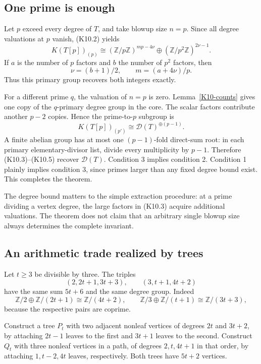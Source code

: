 \documentclass[11pt,a4paper]{article}
\theoremstyle{definition}\newtheorem{definition}[theorem]{Definition}
\theoremstyle{remark}\newtheorem{remark}[theorem]{Remark}
\newcommand{\Z}{\mathbb Z}\newcommand{\Q}{\mathbb Q}\newcommand{\F}{\mathbb F}
\numberwithin{equation}{section}
\begin{document}
\subsection{One prime is enough}\label{K10-sec-3}
Let $p$ exceed every degree of $T$, and take blowup size $n=p$. Since all degree valuations at $p$ vanish, (K10.2) yields
\[
 K(T[p])_{(p)}\cong
 (\Z/p\Z)^{mp-4\nu}\oplus(\Z/p^2\Z)^{2\nu-1}.             \tag{K10.3}
\]
If $a$ is the number of $p$ factors and $b$ the number of $p^2$ factors, then
\[
 \nu=(b+1)/2,\qquad m=(a+4\nu)/p.                           \tag{K10.4}
\]
Thus this primary group recovers both integers exactly.

For a different prime $q$, the valuation of $n=p$ is zero. Lemma~\ref{K10-counts} gives one copy of the $q$-primary degree group in the core. The scalar factors contribute another $p-2$ copies. Hence the prime-to-$p$ subgroup is
\[
 K(T[p])_{(p')}\cong\mathcal D(T)^{\oplus(p-1)}.             \tag{K10.5}
\]
A finite abelian group has at most one $(p-1)$-fold direct-sum root: in each primary elementary-divisor list, divide every multiplicity by $p-1$. Therefore (K10.3)--(K10.5) recover $\mathcal D(T)$. Condition 3 implies condition 2. Condition 1 plainly implies condition 3, since primes larger than any fixed degree bound exist. This completes the theorem.

The degree bound matters to the simple extraction procedure: at a prime dividing a vertex degree, the large factors in (K10.3) acquire additional valuations. The theorem does not claim that an arbitrary single blowup size always determines the complete invariant.

\subsection{An arithmetic trade realized by trees}\label{K10-sec-4}
Let $t\geq3$ be divisible by three. The triples
\[
 (2,2t+1,3t+3),\qquad (3,t+1,4t+2)                          \tag{K10.6}
\]
have the same sum $5t+6$ and the same degree group. Indeed
\[
 \Z/2\oplus\Z/(2t+1)\cong\Z/(4t+2),\qquad
 \Z/3\oplus\Z/(t+1)\cong\Z/(3t+3),                        \tag{K10.7}
\]
because the respective pairs are coprime.

Construct a tree $P_t$ with two adjacent nonleaf vertices of degrees $2t$ and $3t+2$, by attaching $2t-1$ leaves to the first and $3t+1$ leaves to the second. Construct $Q_t$ with three nonleaf vertices in a path, of degrees $2,t,4t+1$ in that order, by attaching $1,t-2,4t$ leaves, respectively. Both trees have $5t+2$ vertices.
\end{document}
